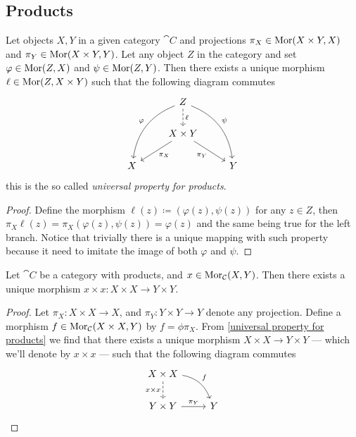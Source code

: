 \subsection{Products}

\begin{proposition}\label{universal property for products}
Let objects \(X, Y\) in a given category \(\cat{C}\) and projections \(\pi_X
\in \operatorname{Mor}(X \times Y, X)\) and \(\pi_Y \in \operatorname{Mor}(X \times Y, Y)\). Let any
object \(Z\) in the category and set \(\varphi \in \operatorname{Mor}(Z, X)\) and \(\psi
\in \operatorname{Mor}(Z, Y)\). Then there exists a unique morphism \(\ell \in \operatorname{Mor}(Z, X
\times Y)\) such that the following diagram commutes
\[
  \begin{tikzcd}
      & Z
      \ar[d, dashed, "\ell"]
      \ar[ddl, bend right, swap, "\varphi"]
      \ar[ddr, bend left, "\psi"]
        & \\
      & X \times Y \ar[dl, "\pi_X"] \ar[dr, swap, "\pi_Y"] \\
    X
      &
        & Y
  \end{tikzcd}
\]
this is the so called \emph{universal property for products}.
\end{proposition}

\begin{proof}
Define the morphism \(\ell(z) \coloneq (\varphi(z), \psi(z))\) for any  \(z \in
Z\), then \(\pi_X  \ell (z) = \pi_X(\varphi(z), \psi(z)) = \varphi(z)\)
and the same being true for the left branch. Notice that trivially there is a
unique mapping with such property because it need to imitate the image of
both \(\varphi\) and \(\psi\).
\end{proof}

\begin{proposition}\label{prop: product-morphism}
Let \(\cat C\) be a category with products, and \(x \in \operatorname{Mor}_{\mathcal C}(X, Y)\).
Then there exists a unique morphism \(x \times x: X \times X \to Y \times Y\).
\end{proposition}

\begin{proof}
Let \(\pi_X: X \times X \to X\), and \(\pi_Y: Y \times Y \to Y\) denote any
projection. Define a morphism \(f \in \operatorname{Mor}_{\mathcal C}(X \times X, Y)\) by \(f =
\phi \pi_X\). From \cref{universal property for products} we find that there
exists a unique morphism \(X \times X \to Y \times Y\) --- which we'll denote
by \(x \times x\) --- such that the following diagram commutes
\[
\begin{tikzcd}
  X \times X \ar[d, dashed, swap, "x \times x"] \ar[dr, bend left, "f"] \\
  Y \times Y \ar[r, "\pi_Y"] &Y
\end{tikzcd}
\]
\end{proof}

